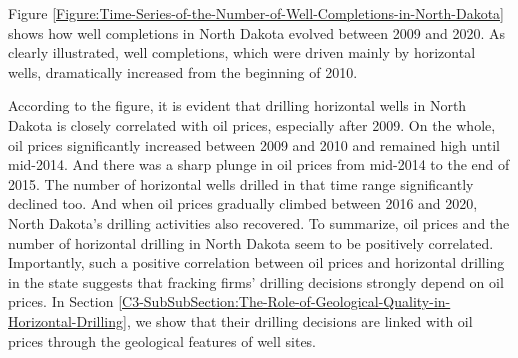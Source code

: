 Figure \ref{Figure:Time-Series-of-the-Number-of-Well-Completions-in-North-Dakota} shows how well completions in North Dakota evolved between 2009 and 2020. As clearly illustrated, well completions, which were driven mainly by horizontal wells, dramatically increased from the beginning of 2010. 

According to the figure, it is evident that drilling horizontal wells in North Dakota is closely correlated with oil prices, especially after 2009. On the whole, oil prices significantly increased between 2009 and 2010 and remained high until mid-2014. And there was a sharp plunge in oil prices from mid-2014 to the end of 2015. The number of horizontal wells drilled in that time range significantly declined too. And when oil prices gradually climbed between 2016 and 2020, North Dakota's drilling activities also recovered. To summarize, oil prices and the number of horizontal drilling in North Dakota seem to be positively correlated. Importantly, such a positive correlation between oil prices and horizontal drilling in the state suggests that fracking firms' drilling decisions strongly depend on oil prices. In Section \ref{C3-SubSubSection:The-Role-of-Geological-Quality-in-Horizontal-Drilling}, we show that their drilling decisions are linked with oil prices through the geological features of well sites.
